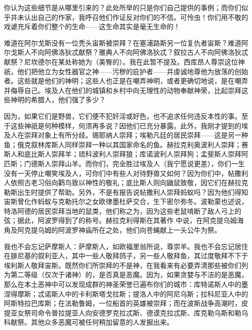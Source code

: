 你认为这些细节是从哪里引来的？此处所举的只是你们自己提供的事例；而你们似乎并未认出自己的作家，我呼召他们作证反对你们的不信。可怜虫！你们用不敬的戏谑充斥着你们整个的生命——这生命其实是毫无生命的！\par

难道在阿尔戈斯没有一位秃头宙斯被崇拜？在塞浦路斯另一位复仇者宙斯？难道阿尔戈斯人不向阿佛洛狄忒献祭？雅典人不向阿佛洛狄忒？叙拉古人不向阿佛洛狄忒献祭？尼坎德尔在某处称她为（美臀的）。我在此暂不提及。西库昂人尊崇这位神祇，他们把他立为女性器官之神——污秽的庇护者——并虔诚地尊他为放荡的创始者。这些就是他们的神明；这些人也正是在嘲弄神明，或者更确切地说，是在嘲弄并侮辱自己。埃及人在他们的城镇和乡村中向无理性的动物奉献神荣，比起崇拜这些神明的希腊人，他们强了多少？\par

因为，如果它们是野兽，它们便不犯奸淫或好色，也不追求任何违反本性的事。至于这些神祇是何种模样，何须再多说？因他们已充分暴露。此外，我刚才提到的埃及人在崇拜对象上有所分歧。锡耶纳人崇拜；埃勒凡廷的居民崇拜——这是另一种鱼；俄克叙林库斯人同样崇拜一种以其国家命名的鱼。赫拉克利奥波利人崇拜；赛斯人和底比斯人崇拜羊；琉科波利人崇拜狼；库诺波利人崇拜狗；孟斐斯人崇拜阿匹斯；门德斯人崇拜山羊。而你们，完全胜过埃及人（我宁愿说更差），你们一生没有一天停止嘲笑埃及人，可你们中有些人对待野兽又如何？因为你们中，帖撒利人依照古老习俗向鹳鸟致以神性的敬礼；底比斯人则向鼬鼠致敬，因它们在赫拉克勒斯出生时提供了帮助。另外，不是有报告说帖撒利人崇拜蚂蚁吗？因为他们得知宙斯曾化作蚂蚁与克勒托尔之女欧律墨杜萨交合，生下密尔弥冬。波勒蒙也述说，特洛阿德的居民崇拜当地的鼠类，他们称之为，因为这些老鼠啃断了敌人弓上的弦；据此，阿波罗得到了的称号。赫拉克利得斯在其著作  中说，在阿克提乌姆海角及阿克提乌姆的阿波罗神庙所在之处，他们向苍蝇献上一头公牛为祭。\par

我也不会忘记萨摩斯人：萨摩斯人，如欧福里翁所说，尊崇羊。我也不会忘记居住在腓尼基的叙利亚人，其中一些人敬拜鸽子，另一些人敬拜鱼，其过度敬拜不下于埃利斯人敬拜宙斯。既然你们所崇拜的不是神，在我看来有必要弄清那些被你们列为第二等级（仅次于诸神）的，是否真是恶魔。因为，如果贪婪与不洁的是恶魔，那么在本土恶神中可以发现成群的神圣荣誉已遍布你们的城市：库特诺斯人中的墨涅得摩斯；忒诺斯人中的卡利斯塔戈拉斯；提洛人中的阿尼乌斯；拉科尼亚人中的阿斯特拉巴库斯；在法勒鲁姆，一位船首的英雄被崇拜；而在波斯战争高潮时，皮提亚女祭司命令普拉提亚人向安德罗克拉忒斯、德谟克拉忒斯、库克勒乌斯和勒乌科献祭。其他众多恶魔可被任何稍加留意的人发掘出来。\par

